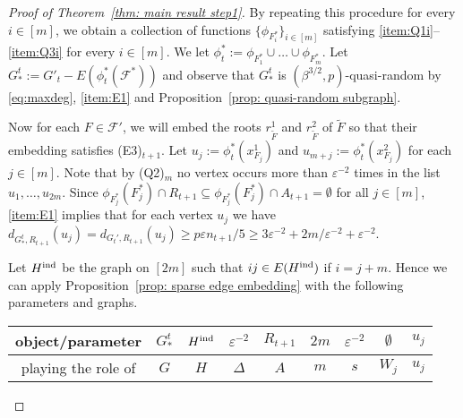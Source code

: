 \documentclass[a4paper, 11pt, reqno]{amsart}
\numberwithin{equation}{section}
\newcommand{\1}{{\rm 1\hspace*{-0.4ex}%
\rule{0.1ex}{1.52ex}\hspace*{0.2ex}}}
\newcommand{\cF}{\mathcal{F}}
\renewcommand{\epsilon}{\varepsilon}
\newcounter{step}
\begin{document}
\begin{proof}[Proof of Theorem~\ref{thm: main result step1}]
By repeating this procedure for every $i\in [m]$, 
we obtain a collection of functions $\{\phi_{F^*_i}\}_{i\in [m]}$ satisfying \ref{item:Q1i}--\ref{item:Q3i} for every $i\in [m]$.
We let $\phi^*_t:=\phi_{F_1^*}\cup \dots \cup \phi_{F_{m}^*}$.
Let $G^t_*:= G'_t - E( \phi^*_t(\cF^*))$
and observe that $G^t_*$ is $(\beta^{3/2},p)$-quasi-random
by 
\eqref{eq:maxdeg}, \ref{item:E1} and Proposition~\ref{prop: quasi-random subgraph}.

Now for each $F\in \cF'$, we will embed the roots $r_{\tilde{F}}^1$ and $r_{\tilde{F}}^2$ of $\tilde{F}$ so that their embedding satisfies (E3)$_{t+1}$.
Let $u_j:= \phi^*_t(x^1_{F_j})$ and $u_{m+j}:= \phi^*_t(x^{2}_{F_j})$ for each $j\in [m]$. 
Note that by (Q2)$_m$ no vertex occurs more than $\epsilon^{-2}$ times in the list $u_1,\dots, u_{2m}$.
Since $\phi_{F^*_j}(F^*_j) \cap R_{t+1} \subseteq \phi_{F^*_j}(F^*_j) \cap A_{t+1} = \emptyset$ for all $j\in [m]$,  
\ref{item:E1} implies that 
for each vertex $u_j$ we have 
$d_{G^t_{*},R_{t+1}}(u_j)
= d_{G_t',R_{t+1}}(u_j)
\geq p\epsilon n_{t+1}/5 
\geq 3\epsilon^{-2} + 2m/\epsilon^{-2}  +\epsilon^{-2}$.

Let $H^{\rm ind}$ be the graph on $[2m]$ such that $ij\in E(H^{\rm ind})$ if $i=j+m$.
Hence we can apply Proposition~\ref{prop: sparse edge embedding} with the following parameters and graphs. \newline
  
\noindent
{
\begin{tabular}{c|c|c|c|c|c|c|c|c}
object/parameter & $G^t_{*}$ & $H^{\rm ind}$ & $ \epsilon^{-2} $ & $R_{t+1}$ &  $2m$ & $\epsilon^{-2} $  & $\emptyset$ & $u_{j}$
\\ \hline
playing the role of & $G$ & $H$ & $\Delta$ & $A$ &  $m$ & $s$  &$W_j$ & $u_j$ 
\end{tabular}
}\newline \vspace{0.2cm}


\end{proof}
\end{document}
